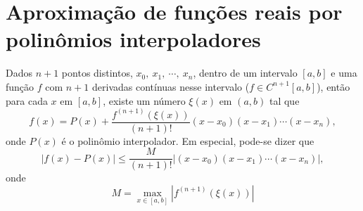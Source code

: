 \section{Aproximação de funções reais por polinômios interpoladores}

\begin{teo}\label{teo_interp}
Dados $n+1$ pontos distintos, $x_0,\ x_1,\ \cdots,\ x_n$, dentro de um intervalo $[a,b]$ e uma função $f$ com $n+1$ derivadas contínuas nesse intervalo ($f\in C^{n+1}[a,b]$), então para cada $x$ em $[a,b]$, existe um número $\xi(x)$ em $(a,b)$ tal que
$$
f(x)=P(x)+\frac{f^{(n+1)}(\xi(x))}{(n+1)!}(x-x_0)(x-x_1)\cdots(x-x_n),
$$
onde $P(x)$ é o polinômio interpolador. Em especial, pode-se dizer que
$$
|f(x)-P(x)|\leq \frac{M}{(n+1)!}\left|(x-x_0)(x-x_1)\cdots(x-x_n)\right|,
$$
onde
$$
M=\max_{x\in[a,b]}|f^{(n+1)}(\xi(x))|
$$
\end{teo}

